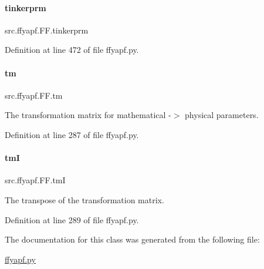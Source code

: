\mbox{\label{classsrc_1_1ffyapf_1_1FF_a8ed82b69537dcbc5f0b436e20689dc22}} 
\paragraph{\texorpdfstring{tinkerprm}{tinkerprm}}
{\footnotesize\ttfamily src.\+ffyapf.\+F\+F.\+tinkerprm}



Definition at line 472 of file ffyapf.\+py.

\mbox{\label{classsrc_1_1ffyapf_1_1FF_ad1fce7db160144f58504671f0a7dd3d6}} 
\paragraph{\texorpdfstring{tm}{tm}}
{\footnotesize\ttfamily src.\+ffyapf.\+F\+F.\+tm}



The transformation matrix for mathematical -\/$>$ physical parameters. 



Definition at line 287 of file ffyapf.\+py.

\mbox{\label{classsrc_1_1ffyapf_1_1FF_a1cb1c9305460432c3503ba9b7394acc5}} 
\paragraph{\texorpdfstring{tmI}{tmI}}
{\footnotesize\ttfamily src.\+ffyapf.\+F\+F.\+tmI}



The transpose of the transformation matrix. 



Definition at line 289 of file ffyapf.\+py.



The documentation for this class was generated from the following file\+:\begin{DoxyCompactItemize}
\item 
\hyperlink{ffyapf_8py}{ffyapf.\+py}\end{DoxyCompactItemize}
